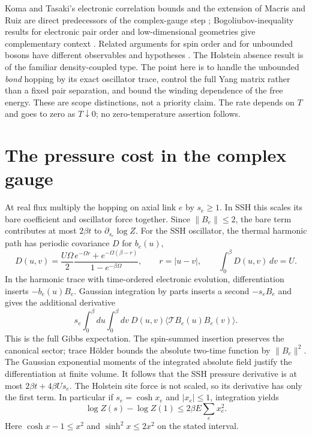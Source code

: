\documentclass[11pt]{article}
\begin{document}
Koma and Tasaki's electronic correlation bounds and the extension of Macris and Ruiz are direct predecessors of the complex-gauge step \cite{koma,macris}; Bogoliubov-inequality results for electronic pair order and low-dimensional geometries give complementary context \cite{su,gelfert}. Related arguments for spin order and for unbounded bosons have different observables and hypotheses \cite{loss,stachura}. The Holstein absence result is of the familiar density-coupled type. The point here is to handle the unbounded \emph{bond} hopping by its exact oscillator trace, control the full Yang matrix rather than a fixed pair separation, and bound the winding dependence of the free energy. These are scope distinctions, not a priority claim. The rate depends on $T$ and goes to zero as $T\downarrow0$; no zero-temperature assertion follows.

\section{The pressure cost in the complex gauge}
At real flux multiply the hopping on axial link $e$ by $s_e\ge1$. In SSH this scales its bare coefficient and oscillator force together. Since $\|B_e\|\le2$, the bare term contributes at most $2\beta t$ to $\partial_{s_e}\log Z$. For the SSH oscillator, the thermal harmonic path has periodic covariance $D$ for $b_e(u)$,
\[
 D(u,v)=\frac{U\Omega}{2}\frac{e^{-\Omega r}+e^{-\Omega(\beta-r)}}{1-e^{-\beta\Omega}},
 \qquad r=|u-v|,\qquad \int_0^\beta D(u,v)\,dv=U.
\]
In the harmonic trace with time-ordered electronic evolution, differentiation inserts $-b_e(u)B_e$. Gaussian integration by parts inserts a second $-s_e B_e$ and gives the additional derivative
\[
 s_e\int_0^\beta\!du\int_0^\beta\!dv\ D(u,v)\langle\mathcal T B_e(u)B_e(v)\rangle.
\]
This is the full Gibbs expectation. The spin-summed insertion preserves the canonical sector; trace H\"older bounds the absolute two-time function by $\|B_e\|^2$. The Gaussian exponential moments of the integrated absolute field justify the differentiation at finite volume. It follows that the SSH pressure derivative is at most $2\beta t+4\beta U s_e$. The Holstein site force is not scaled, so its derivative has only the first term. In particular if $s_e=\cosh x_e$ and $|x_e|\le1$, integration yields
\begin{equation}\label{eq:cost}
 \log Z(s)-\log Z(1)\le 2\beta E\sum_e x_e^2.
\end{equation}
Here $\cosh x-1\le x^2$ and $\sinh^2 x\le2x^2$ on the stated interval.
\end{document}
